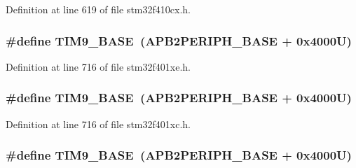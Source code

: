 Definition at line 619 of file stm32f410cx.\+h.

\subsubsection[{\texorpdfstring{T\+I\+M9\+\_\+\+B\+A\+SE}{TIM9_BASE}}]{\setlength{\rightskip}{0pt plus 5cm}\#define T\+I\+M9\+\_\+\+B\+A\+SE~({\bf A\+P\+B2\+P\+E\+R\+I\+P\+H\+\_\+\+B\+A\+SE} + 0x4000\+U)}\hypertarget{group___peripheral__registers__structures_ga92ae902be7902560939223dd765ece08}{}\label{group___peripheral__registers__structures_ga92ae902be7902560939223dd765ece08}


Definition at line 716 of file stm32f401xe.\+h.

\subsubsection[{\texorpdfstring{T\+I\+M9\+\_\+\+B\+A\+SE}{TIM9_BASE}}]{\setlength{\rightskip}{0pt plus 5cm}\#define T\+I\+M9\+\_\+\+B\+A\+SE~({\bf A\+P\+B2\+P\+E\+R\+I\+P\+H\+\_\+\+B\+A\+SE} + 0x4000\+U)}\hypertarget{group___peripheral__registers__structures_ga92ae902be7902560939223dd765ece08}{}\label{group___peripheral__registers__structures_ga92ae902be7902560939223dd765ece08}


Definition at line 716 of file stm32f401xc.\+h.

\subsubsection[{\texorpdfstring{T\+I\+M9\+\_\+\+B\+A\+SE}{TIM9_BASE}}]{\setlength{\rightskip}{0pt plus 5cm}\#define T\+I\+M9\+\_\+\+B\+A\+SE~({\bf A\+P\+B2\+P\+E\+R\+I\+P\+H\+\_\+\+B\+A\+SE} + 0x4000\+U)}\hypertarget{group___peripheral__registers__structures_ga92ae902be7902560939223dd765ece08}{}\label{group___peripheral__registers__structures_ga92ae902be7902560939223dd765ece08}


